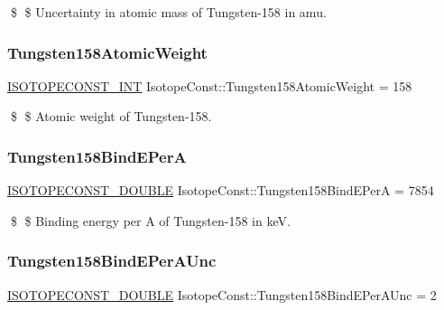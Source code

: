 \$ \$ Uncertainty in atomic mass of Tungsten-\/158 in amu. \mbox{\label{group___isotope_const-_tungsten-_w158_ga7d4848717bd9b6ad7d84903ed56480a3}} 
\subsubsection{\texorpdfstring{Tungsten158\+Atomic\+Weight}{Tungsten158AtomicWeight}}
{\footnotesize\ttfamily \mbox{\hyperlink{group___isotope_const-_macros_ga5f18360b3e99483a35c32d789e62621c}{I\+S\+O\+T\+O\+P\+E\+C\+O\+N\+S\+T\+\_\+\+I\+NT}} Isotope\+Const\+::\+Tungsten158\+Atomic\+Weight = 158}

\$ \$ Atomic weight of Tungsten-\/158. \mbox{\label{group___isotope_const-_tungsten-_w158_ga461a05a960eb952225d5037fe7528e61}} 
\subsubsection{\texorpdfstring{Tungsten158\+Bind\+E\+PerA}{Tungsten158BindEPerA}}
{\footnotesize\ttfamily \mbox{\hyperlink{group___isotope_const-_macros_ga8f45a7272ce02c0b4c65c44636ed719a}{I\+S\+O\+T\+O\+P\+E\+C\+O\+N\+S\+T\+\_\+\+D\+O\+U\+B\+LE}} Isotope\+Const\+::\+Tungsten158\+Bind\+E\+PerA = 7854}

\$ \$ Binding energy per A of Tungsten-\/158 in keV. \mbox{\label{group___isotope_const-_tungsten-_w158_ga8f2fa29fb8f75ed66f70a51122956186}} 
\subsubsection{\texorpdfstring{Tungsten158\+Bind\+E\+Per\+A\+Unc}{Tungsten158BindEPerAUnc}}
{\footnotesize\ttfamily \mbox{\hyperlink{group___isotope_const-_macros_ga8f45a7272ce02c0b4c65c44636ed719a}{I\+S\+O\+T\+O\+P\+E\+C\+O\+N\+S\+T\+\_\+\+D\+O\+U\+B\+LE}} Isotope\+Const\+::\+Tungsten158\+Bind\+E\+Per\+A\+Unc = 2}

